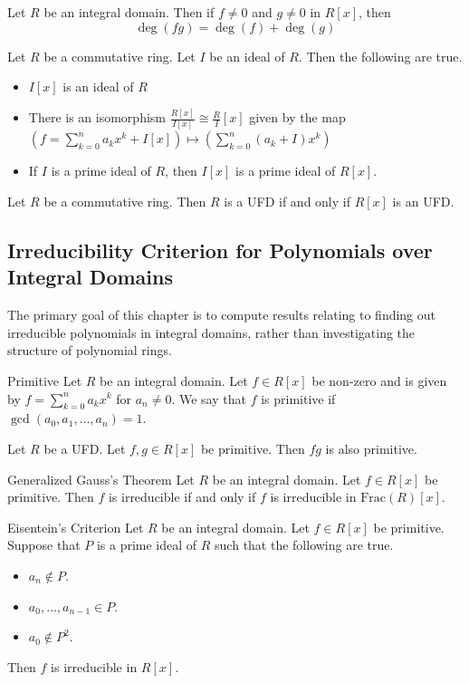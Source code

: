 \documentclass[a4paper]{article}
\begin{document}
\begin{prp}{}{} Let $R$ be an integral domain. Then if $f\neq 0$ and $g\neq 0$ in $R[x]$, then $$\deg(fg)=\deg(f)+\deg(g)$$
\end{prp}

\begin{prp}{}{} Let $R$ be a commutative ring. Let $I$ be an ideal of $R$. Then the following are true. 
\begin{itemize}
\item $I[x]$ is an ideal of $R$
\item There is an isomorphism $\frac{R[x]}{I[x]}\cong\frac{R}{I}[x]$ given by the map $\left(f=\sum_{k=0}^na_kx^k+I[x]\right)\mapsto\left(\sum_{k=0}^n(a_k+I)x^k\right)$
\item If $I$ is a prime ideal of $R$, then $I[x]$ is a prime ideal of $R[x]$. 
\end{itemize}
\end{prp}

\begin{prp}{}{} Let $R$ be a commutative ring. Then $R$ is a UFD if and only if $R[x]$ is an UFD. 
\end{prp}

\subsection{Irreducibility Criterion for Polynomials over Integral Domains}
The primary goal of this chapter is to compute results relating to finding out irreducible polynomials in integral domains, rather than investigating the structure of polynomial rings. 

\begin{defn}{Primitive}{} Let $R$ be an integral domain. Let $f\in R[x]$ be non-zero and is given by $f=\sum_{k=0}^na_kx^k$ for $a_n\neq 0$. We say that $f$ is primitive if $\gcd(a_0,a_1,\dots,a_n)=1$. 
\end{defn}

\begin{prp}{}{} Let $R$ be a UFD. Let $f,g\in R[x]$ be primitive. Then $fg$ is also primitive. 
\end{prp}

\begin{thm}{Generalized Gauss's Theorem}{} Let $R$ be an integral domain. Let $f\in R[x]$ be primitive. Then $f$ is irreducible if and only if $f$ is irreducible in $\text{Frac}(R)[x]$. 
\end{thm}

\begin{prp}{Eisentein's Criterion}{} Let $R$ be an integral domain. Let $f\in R[x]$ be primitive. Suppose that $P$ is a prime ideal of $R$ such that the following are true. 
\begin{itemize}
\item $a_n\notin P$. 
\item $a_0,\dots,a_{n-1}\in P$. 
\item $a_0\notin P^2$. 
\end{itemize}
Then $f$ is irreducible in $R[x]$. 
\end{prp}
\end{document}
